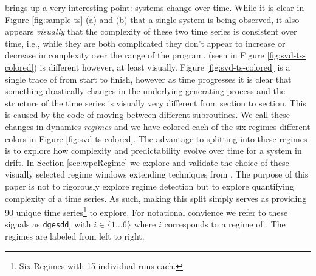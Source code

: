 \svd brings up a very interesting point: systems change over time. While it is clear in Figure \ref{fig:sample-ts} (a) and (b) that a single system is being observed, it also appears \emph{visually} that the complexity of these two time series is consistent over time, i.e., while they are both complicated they don't appear to increase or decrease in complexity over the range of the program. \svd (seen in Figure \ref{fig:svd-ts-colored}) is different however, at least visually. Figure \ref{fig:svd-ts-colored} is a single trace of \svd from start to finish, however as time progresses it is clear that something drastically changes in the underlying generating process and the structure of the time series is visually very different from section to section. This is caused by the code of \svd moving between different subroutines. We call these changes in \svd dynamics  \emph{\svd regimes} and we have colored each of the six regimes different colors in Figure \ref{fig:svd-ts-colored}. The advantage to splitting \svd into these regimes is to explore how complexity and predictability evolve over time for a system in drift. In Section \ref{sec:wpeRegime} we explore and validate the choice of these visually selected regime windows extending techniques from \cite{cao2004det}. The purpose of this paper is not to rigorously explore regime detection but to explore quantifying complexity of a time series. As such, making this split simply serves as providing 90 unique time series\footnote{Six Regimes with 15 individual runs each.} to explore. For notational convience we refer to these signals as {\tt dgesdd$_i$} with $i \in \{1\dots6\}$ where $i$ corresponds to a regime of \svd. The regimes are labeled from left to right. 



